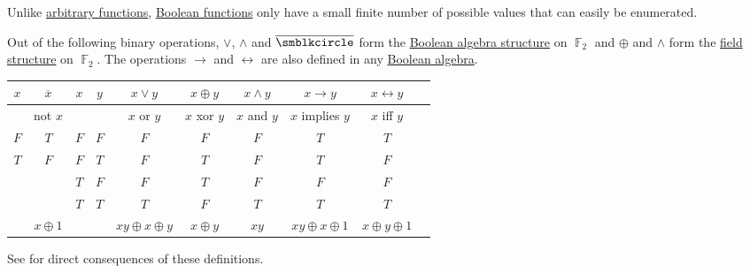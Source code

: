 \begin{definition}\label{def:standard_boolean_operators}
  Unlike \hyperref[def:function]{arbitrary functions}, \hyperref[def:boolean_function]{Boolean functions} only have a small finite number of possible values that can easily be enumerated.

  Out of the following binary operations, \( \vee \), \( \wedge \) and \( \overline{\placeholder} \) form the \hyperref[thm:f2_is_boolean_algebra]{Boolean algebra structure} on \( \BbbF_2 \) and \( \oplus \) and \( \wedge \) form the \hyperref[def:field]{field structure} on \( \BbbF_2 \). The operations \( \rightarrow \) and \( \leftrightarrow \) are also defined in any \hyperref[def:boolean_algebra]{Boolean algebra}.

  \begin{center}
    \begin{tabular}{c | c || c c | c c c c c c}
      \( x \) & \( \overline{x} \) & \( x \) & \( y \) & \( x \vee y \) & \( x \oplus y \)    & \( x \wedge y \) & \( x \rightarrow y \)   & \( x \leftrightarrow y \) \\
      \hline
              & not \( x \)        &         &         & \( x \) or \( y \)  & \( x \) xor \( y \) & \( x \) and \( y \)     & \( x \) implies \( y \) & \( x \) iff \( y \)       \\
      \hline
      \( F \) & \( T \)            & \( F \) & \( F \) & \( F \)             & \( F \)             & \( F \)                 & \( T \)                 & \( T \)                   \\
      \( T \) & \( F \)            & \( F \) & \( T \) & \( F \)             & \( T \)             & \( F \)                 & \( T \)                 & \( F \)                   \\
              &                    & \( T \) & \( F \) & \( F \)             & \( T \)             & \( F \)                 & \( F \)                 & \( F \)                   \\
              &                    & \( T \) & \( T \) & \( T \)             & \( F \)             & \( T \)                 & \( T \)                 & \( T \)                   \\
      \hline
              & \( x \oplus 1 \) &         &         & \( xy \oplus x \oplus y \) & \( x \oplus y \)    & \( xy \)            & \( xy \oplus x \oplus 1 \) & \( x \oplus y \oplus 1 \)
    \end{tabular}
  \end{center}

  See  for direct consequences of these definitions.
\end{definition}

